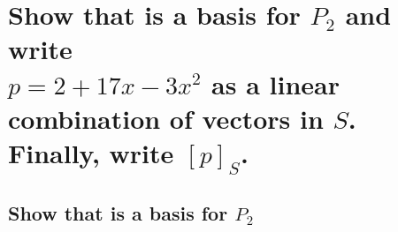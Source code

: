 \documentclass[../main.tex]{subfiles}
\begin{document}

\section{Show that  is a basis for $P_2$ and write \\
  $p = 2 + 17x - 3x^2$ as a linear combination of vectors in $S$. Finally, write $[p]_S$.}
\subsection{Show that  is a basis for $P_2$}
\end{document}
